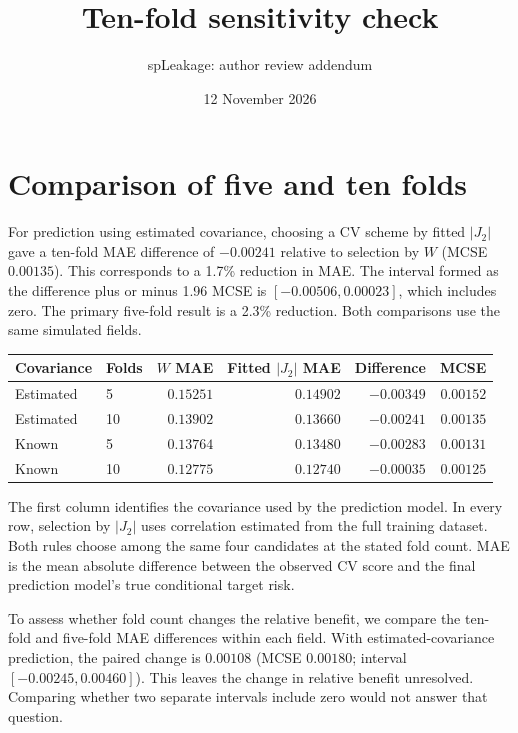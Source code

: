 \documentclass[11pt,a4paper]{article}
\title{Ten-fold sensitivity check}
\author{spLeakage: author review addendum}
\date{12 November 2026}
\begin{document}
\maketitle
\section*{Comparison of five and ten folds}
For prediction using estimated covariance, choosing a CV scheme by fitted $|J_2|$ gave a ten-fold MAE difference of \( -0.00241 \) relative to selection by $W$ (MCSE \( 0.00135 \)). This corresponds to a 1.7\% reduction in MAE. The interval formed as the difference plus or minus 1.96 MCSE is \([-0.00506,0.00023]\), which includes zero. The primary five-fold result is a 2.3\% reduction. Both comparisons use the same simulated fields.

\begin{center}\small
\begin{tabular}{llrrrr}\toprule
Covariance & Folds & $W$ MAE & Fitted $|J_2|$ MAE & Difference & MCSE\\\midrule
Estimated & 5 & $0.15251$ & $0.14902$ & $-0.00349$ & $0.00152$ \\
Estimated & 10 & $0.13902$ & $0.13660$ & $-0.00241$ & $0.00135$ \\
Known & 5 & $0.13764$ & $0.13480$ & $-0.00283$ & $0.00131$ \\
Known & 10 & $0.12775$ & $0.12740$ & $-0.00035$ & $0.00125$ \\
\bottomrule\end{tabular}
\end{center}
The first column identifies the covariance used by the prediction model. In every row, selection by $|J_2|$ uses correlation estimated from the full training dataset. Both rules choose among the same four candidates at the stated fold count. MAE is the mean absolute difference between the observed CV score and the final prediction model's true conditional target risk.

To assess whether fold count changes the relative benefit, we compare the ten-fold and five-fold MAE differences within each field. With estimated-covariance prediction, the paired change is \( 0.00108 \) (MCSE \( 0.00180 \); interval \([-0.00245,0.00460]\)). This leaves the change in relative benefit unresolved. Comparing whether two separate intervals include zero would not answer that question.
\end{document}
